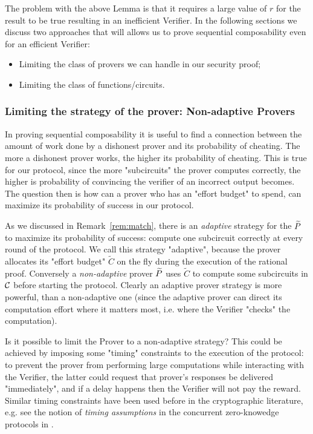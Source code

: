 The problem with the above Lemma is that it requires a large value of $r$ for the result to be true resulting in an inefficient Verifier. In the following
sections we discuss two approaches that will allows us to prove sequential composability even for an efficient Verifier:
\begin{itemize}
\item Limiting the class of provers we can handle in our security proof;
\item Limiting the class of functions/circuits.
\end{itemize}


\subsubsection{Limiting the strategy of the prover: Non-adaptive Provers}

\smallskip
\noindent
In proving sequential composability it is useful to find a connection between the amount of work done by a dishonest prover and its probability of cheating. The more a dishonest prover works, the higher its probability of cheating. This is true for our protocol, since the more "subcircuits" the prover computes correctly, the higher is probability of convincing the verifier of an incorrect output becomes. The question then is how can a prover who has an "effort budget" to spend, can maximize its probability of success in our protocol. 

As we discussed in Remark~\ref{rem:match}, there is an {\em adaptive} strategy for the $\widetilde{P}$ to maximize its probability of success: compute one subcircuit correctly at every round of the protocol. We call this strategy "adaptive", because the prover allocates its "effort budget" $\tilde{C}$ on the fly during the execution of the rational proof. Conversely a {\em non-adaptive} prover $\widetilde{P}$ uses $\tilde{C}$ to compute some subcircuits in $\cal C$ before starting the protocol. Clearly an adaptive prover strategy is more powerful, than a non-adaptive one (since the adaptive prover can direct its computation effort where it matters most, i.e. where the Verifier "checks" the computation). 

Is it possible to limit the Prover to a non-adaptive strategy? This could be achieved by imposing some "timing" constraints to the execution of the protocol: to prevent the prover from performing large computations while interacting with the Verifier, the latter could request that prover's responses be delivered "immediately", and if a delay happens then the Verifier will not pay the reward. Similar timing constraints have been used before in the cryptographic literature, e.g. see the notion of {\em timing assumptions} in the concurrent zero-knowedge protocols in \cite{dns}.


